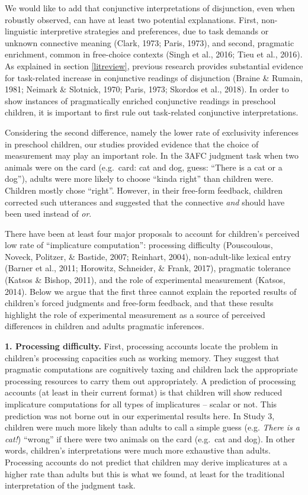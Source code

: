 \documentclass[floatsintext,man]{apa6}
\theoremstyle{definition}
\theoremstyle{definition}
\theoremstyle{definition}
\theoremstyle{remark}
\begin{document}
We would like to add that conjunctive interpretations of disjunction,
even when robustly observed, can have at least two potential
explanations. First, non-linguistic interpretive strategies and
preferences, due to task demands or unknown connective meaning (Clark,
1973; Paris, 1973), and second, pragmatic enrichment, common in
free-choice contexts (Singh et al., 2016; Tieu et al., 2016). As
explained in section \ref{litreview}, previous research provides
substantial evidence for task-related increase in conjunctive readings
of disjunction (Braine \& Rumain, 1981; Neimark \& Slotnick, 1970;
Paris, 1973; Skordos et al., 2018). In order to show instances of
pragmatically enriched conjunctive readings in preschool children, it is
important to first rule out task-related conjunctive interpretations.

Considering the second difference, namely the lower rate of exclusivity
inferences in preschool children, our studies provided evidence that the
choice of measurement may play an important role. In the 3AFC judgment
task when two animals were on the card (e.g.~card: cat and dog, guess:
\enquote{There is a cat or a dog}), adults were more likely to choose
\enquote{kinda right} than children were. Children mostly chose
\enquote{right}. However, in their free-form feedback, children
corrected such utterances and suggested that the connective \emph{and}
should have been used instead of \emph{or}.

There have been at least four major proposals to account for children's
perceived low rate of \enquote{implicature computation}: processing
difficulty (Pouscoulous, Noveck, Politzer, \& Bastide, 2007; Reinhart,
2004), non-adult-like lexical entry (Barner et al., 2011; Horowitz,
Schneider, \& Frank, 2017), pragmatic tolerance (Katsos \& Bishop,
2011), and the role of experimental measurement (Katsos, 2014). Below we
argue that the first three cannot explain the reported results of
children's forced judgments and free-form feedback, and that these
results highlight the role of experimental measurement as a source of
perceived differences in children and adults pragmatic inferences.

\textbf{1. Processing difficulty.} First, processing accounts locate the
problem in children's processing capacities such as working memory. They
suggest that pragmatic computations are cognitively taxing and children
lack the appropriate processing resources to carry them out
appropriately. A prediction of processing accounts (at least in their
current format) is that children will show reduced implicature
computations for all types of implicatures -- scalar or not. This
prediction was not borne out in our experimental results here. In Study
3, children were much more likely than adults to call a simple guess
(e.g. \emph{There is a cat!}) \enquote{wrong} if there were two animals
on the card (e.g.~cat and dog). In other words, children's
interpretations were much more exhaustive than adults. Processing
accounts do not predict that children may derive implicatures at a
higher rate than adults but this is what we found, at least for the
traditional interpretation of the judgment task.
\end{document}
